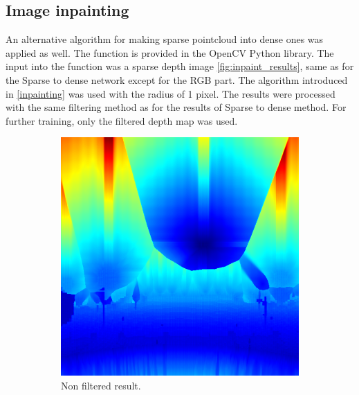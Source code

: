 \documentclass[twoside]{ctuthesis}
\theoremstyle{plain}
\theoremstyle{definition}
\theoremstyle{note}
\begin{document}
\subsection{Image inpainting}
An alternative algorithm for making sparse pointcloud into dense ones was applied as well. The function is provided in the OpenCV Python library. The input into the function was a sparse depth image \ref{fig:inpaint_results}, same as for the Sparse to dense network except for the RGB part. The algorithm introduced in \ref{inpainting} was used with the radius of 1 pixel. The results were processed with the same filtering method as for the results of Sparse to dense method. For further training, only the filtered depth map was used.
\begin{figure}
	\centering
	\begin{subfigure}[b]{0.3\textwidth}
		\centering
		\includegraphics[width=\textwidth]{raw_inpaint.png}
		\caption{Non filtered result.}
	\end{subfigure}
	\hfill
	\begin{subfigure}[b]{0.3\textwidth}
		\centering

\end{subfigure}
\end{figure}
\end{document}
